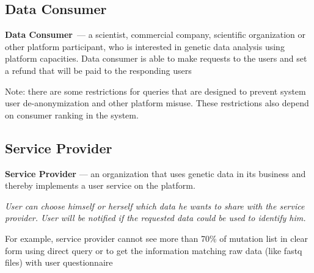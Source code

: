 \subsection{Data Consumer}

\textbf{Data Consumer}~--- a scientist, commercial company, scientific organization or other platform participant, who is interested in genetic data analysis using platform capacities. Data consumer is able to make requests to the users and set a refund that will be paid to the responding users

\begin{note}
Note: there are some restrictions for queries that are designed to prevent system user de-anonymization and other platform misuse. These restrictions also depend on consumer ranking in the system.
\end{note}


\subsection{Service Provider}

\textbf{Service Provider} --- an organization that uses genetic data in its business and thereby implements a user service on the platform.
\begin{note}\it
User can choose himself or herself which data he wants to share with the service provider. User will be notified if the requested data could be used to identify him.
\end{note}

\begin{note}
For example, service provider cannot see more than 70\% of mutation list in clear form using direct query or to get the information matching raw data (like fastq files) with user questionnaire
\end{note}
